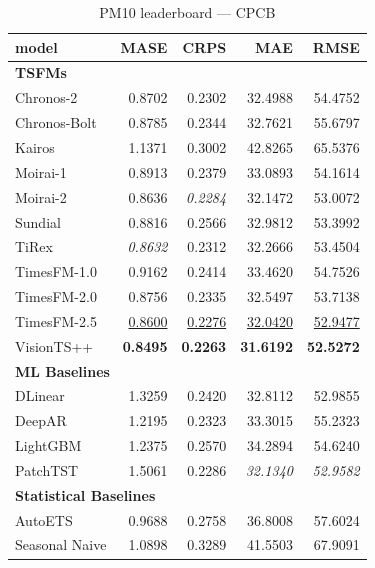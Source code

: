 \begin{table}[H]
\caption{PM10 leaderboard --- CPCB}
\centering
\begin{small}
\begin{tabular}{lrrrr}
\toprule
model & MASE & CRPS & MAE & RMSE \\
\midrule
\multicolumn{5}{l}{\textbf{TSFMs}} \\
Chronos-2 & 0.8702 & 0.2302 & 32.4988 & 54.4752 \\
Chronos-Bolt & 0.8785 & 0.2344 & 32.7621 & 55.6797 \\
Kairos & 1.1371 & 0.3002 & 42.8265 & 65.5376 \\
Moirai-1 & 0.8913 & 0.2379 & 33.0893 & 54.1614 \\
Moirai-2 & 0.8636 & \textit{0.2284} & 32.1472 & 53.0072 \\
Sundial & 0.8816 & 0.2566 & 32.9812 & 53.3992 \\
TiRex & \textit{0.8632} & 0.2312 & 32.2666 & 53.4504 \\
TimesFM-1.0 & 0.9162 & 0.2414 & 33.4620 & 54.7526 \\
TimesFM-2.0 & 0.8756 & 0.2335 & 32.5497 & 53.7138 \\
TimesFM-2.5 & \underline{0.8600} & \underline{0.2276} & \underline{32.0420} & \underline{52.9477} \\
VisionTS++ & \textbf{0.8495} & \textbf{0.2263} & \textbf{31.6192} & \textbf{52.5272} \\
\midrule
\multicolumn{5}{l}{\textbf{ML Baselines}} \\
DLinear & 1.3259 & 0.2420 & 32.8112 & 52.9855 \\
DeepAR & 1.2195 & 0.2323 & 33.3015 & 55.2323 \\
LightGBM & 1.2375 & 0.2570 & 34.2894 & 54.6240 \\
PatchTST & 1.5061 & 0.2286 & \textit{32.1340} & \textit{52.9582} \\
\midrule
\multicolumn{5}{l}{\textbf{Statistical Baselines}} \\
AutoETS & 0.9688 & 0.2758 & 36.8008 & 57.6024 \\
Seasonal Naive & 1.0898 & 0.3289 & 41.5503 & 67.9091 \\
\bottomrule
\end{tabular}
\end{small}
\end{table}